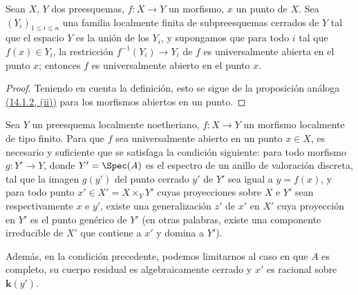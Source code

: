 \begin{proposition}[14.3.5]
\label{IV.14.3.5}
Sean $X$, $Y$ dos preesquemas, $f:X\to Y$ un morfismo, $x$ un punto de $X$.
Sea $(Y_i)_{1\leq i\leq n}$ una familia localmente finita de subpreesquemas cerrados de $Y$ tal que el espacio $Y$ es la unión de los $Y_i$, y supongamos que para todo $i$ tal que $f(x)\in Y_i$, la restricción $f^{-1}(Y_i)\to Y_i$ de $f$ es universalmente abierta en el punto $x$; entonces $f$ es universalmente abierto en el punto $x$.
\end{proposition}

\begin{proof}
Teniendo en cuenta la definición, esto se sigue de la proposición análoga {\hyperlink{ega4.c04.prop.14-1-2}{(14.1.2, (ii))}} para los morfismos abiertos en un punto.
\end{proof}

\begin{proposition}[14.3.6]
\label{IV.14.3.6}
Sea $Y$ un preesquema localmente noetheriano, $f:X\to Y$ un morfismo localmente de tipo finito.
Para que $f$ sea universalmente abierto en un punto $x\in X$, es necesario y suficiente que se satisfaga la condición siguiente: para todo morfismo $g:Y'\to Y$, donde $Y'=\Spec(A)$ es el espectro de un anillo de valoración discreta, tal que la imagen $g(y')$ del punto cerrado $y'$ de $Y'$ sea igual a $y=f(x)$, y para todo punto $x'\in X'=X\times_Y Y'$ cuyas proyecciones sobre $X$ e $Y'$ sean respectivamente $x$ e $y'$, existe una generalización $z'$ de $x'$ en $X'$ cuya proyección en $Y'$ es el punto genérico de $Y'$ \textup{(en otras palabras,} existe una componente irreducible de $X'$ que contiene a $x'$ y domina a $Y'$\textup{)}.


Además, en la condición precedente, podemos limitarnos al caso en que $A$ es completo, su cuerpo residual es algebraicamente cerrado y $x'$ es racional sobre $\boldsymbol k(y')$.
\end{proposition}

